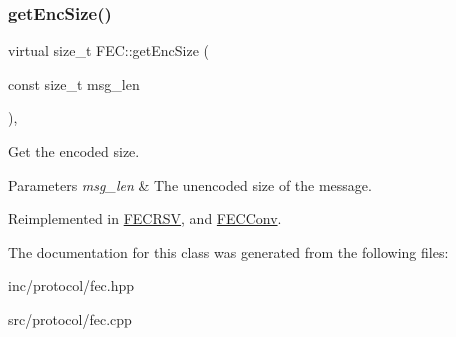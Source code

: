 \subsubsection{\texorpdfstring{get\+Enc\+Size()}{getEncSize()}}
{\footnotesize\ttfamily virtual size\+\_\+t F\+E\+C\+::get\+Enc\+Size (\begin{DoxyParamCaption}\item[{const size\+\_\+t}]{msg\+\_\+len }\end{DoxyParamCaption})\hspace{0.3cm}{\ttfamily [inline]}, {\ttfamily [virtual]}}

Get the encoded size. 
\begin{DoxyParams}{Parameters}
{\em msg\+\_\+len} & The unencoded size of the message. \\
\hline
\end{DoxyParams}


Reimplemented in \hyperlink{classFECRSV_a62fb01c152dad2e043ae75bbacfd928c}{F\+E\+C\+R\+SV}, and \hyperlink{classFECConv_a3b49acf69440d2677e3181513b9f3592}{F\+E\+C\+Conv}.



The documentation for this class was generated from the following files\+:\begin{DoxyCompactItemize}
\item 
inc/protocol/fec.\+hpp\item 
src/protocol/fec.\+cpp\end{DoxyCompactItemize}
